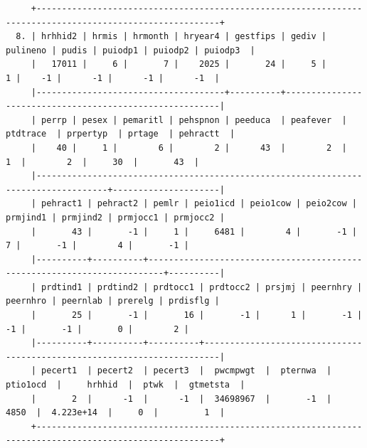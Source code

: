 \documentclass[
]{book}
\begin{document}
\begin{verbatim}
     +----------------------------------------------------------------------------------------------------------+
  8. | hrhhid2 | hrmis | hrmonth | hryear4 | gestfips | gediv | pulineno | pudis | puiodp1 | puiodp2 | puiodp3  |
     |   17011 |     6 |       7 |    2025 |       24 |     5 |        1 |    -1 |      -1 |      -1 |      -1  |
     |-------------------------------------+----------+---------------------------------------------------------|
     | perrp | pesex | pemaritl | pehspnon | peeduca  | peafever  | ptdtrace  | prpertyp  | prtage  | pehractt  |
     |    40 |     1 |        6 |        2 |      43  |        2  |        1  |        2  |     30  |       43  |
     |------------------------------------------------------------------------------------+---------------------|
     | pehract1 | pehract2 | pemlr | peio1icd | peio1cow | peio2cow | prmjind1 | prmjind2 | prmjocc1 | prmjocc2 |
     |       43 |       -1 |     1 |     6481 |        4 |       -1 |        7 |       -1 |        4 |       -1 |
     |----------+----------+-------------------------------------------------------------------------+----------|
     | prdtind1 | prdtind2 | prdtocc1 | prdtocc2 | prsjmj | peernhry | peernhro | peernlab | prerelg | prdisflg |
     |       25 |       -1 |       16 |       -1 |      1 |       -1 |       -1 |       -1 |       0 |        2 |
     |----------+----------+----------+-------------------------------------------------------------------------|
     | pecert1  | pecert2  | pecert3  |  pwcmpwgt  |  pternwa  |  ptio1ocd  |     hrhhid  |  ptwk  |  gtmetsta  |
     |       2  |      -1  |      -1  |  34698967  |       -1  |      4850  |  4.223e+14  |     0  |         1  |
     +----------------------------------------------------------------------------------------------------------+


\end{verbatim}
\end{document}
